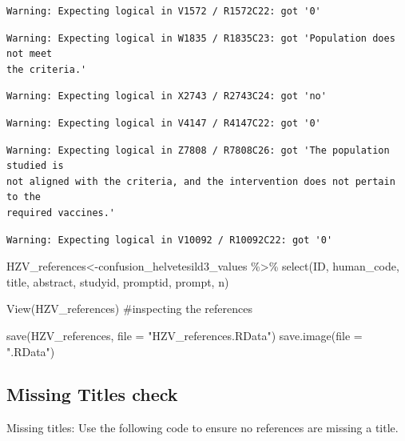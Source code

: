 \documentclass[
  letterpaper,
  DIV=11,
  numbers=noendperiod]{scrartcl}
\newenvironment{Shaded}{\begin{snugshade}}{\end{snugshade}}
\newcommand{\AttributeTok}[1]{\textcolor[rgb]{0.40,0.45,0.13}{#1}}
\newcommand{\CommentTok}[1]{\textcolor[rgb]{0.37,0.37,0.37}{#1}}
\newcommand{\FunctionTok}[1]{\textcolor[rgb]{0.28,0.35,0.67}{#1}}
\newcommand{\NormalTok}[1]{\textcolor[rgb]{0.00,0.23,0.31}{#1}}
\newcommand{\OtherTok}[1]{\textcolor[rgb]{0.00,0.23,0.31}{#1}}
\newcommand{\SpecialCharTok}[1]{\textcolor[rgb]{0.37,0.37,0.37}{#1}}
\newcommand{\StringTok}[1]{\textcolor[rgb]{0.13,0.47,0.30}{#1}}
\begin{document}
\begin{verbatim}
Warning: Expecting logical in V1572 / R1572C22: got '0'
\end{verbatim}

\begin{verbatim}
Warning: Expecting logical in W1835 / R1835C23: got 'Population does not meet
the criteria.'
\end{verbatim}

\begin{verbatim}
Warning: Expecting logical in X2743 / R2743C24: got 'no'
\end{verbatim}

\begin{verbatim}
Warning: Expecting logical in V4147 / R4147C22: got '0'
\end{verbatim}

\begin{verbatim}
Warning: Expecting logical in Z7808 / R7808C26: got 'The population studied is
not aligned with the criteria, and the intervention does not pertain to the
required vaccines.'
\end{verbatim}

\begin{verbatim}
Warning: Expecting logical in V10092 / R10092C22: got '0'
\end{verbatim}

\begin{Shaded}
\begin{Highlighting}[]
\NormalTok{HZV\_references}\OtherTok{\textless{}{-}}\NormalTok{confusion\_helvetesild3\_values }\SpecialCharTok{\%\textgreater{}\%} 
  \FunctionTok{select}\NormalTok{(ID, human\_code, title, abstract, studyid, promptid, prompt, n)}

\FunctionTok{View}\NormalTok{(HZV\_references) }\CommentTok{\#inspecting the references}

\FunctionTok{save}\NormalTok{(HZV\_references, }\AttributeTok{file =} \StringTok{"HZV\_references.RData"}\NormalTok{)}
\FunctionTok{save.image}\NormalTok{(}\AttributeTok{file =} \StringTok{".RData"}\NormalTok{)}
\end{Highlighting}
\end{Shaded}

\subsection{Missing Titles check}\label{missing-titles-check}

Missing titles: Use the following code to ensure no references are
missing a title.
\end{document}
